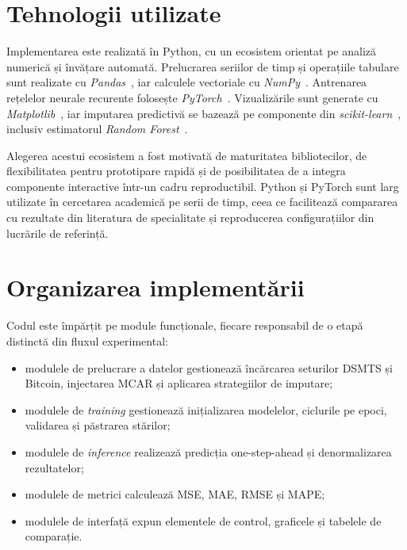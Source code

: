 \section{Tehnologii utilizate}

Implementarea este realizată în Python, cu un ecosistem orientat pe analiză numerică și învățare automată. Prelucrarea seriilor de timp și operațiile tabulare sunt realizate cu \textit{Pandas}~\cite{mckinney2010pandas}, iar calculele vectoriale cu \textit{NumPy}~\cite{harris2020numpy}. Antrenarea rețelelor neurale recurente folosește \textit{PyTorch}~\cite{paszke2019pytorch}. Vizualizările sunt generate cu \textit{Matplotlib}~\cite{hunter2007matplotlib}, iar imputarea predictivă se bazează pe componente din \textit{scikit-learn}~\cite{pedregosa2011sklearn}, inclusiv estimatorul \textit{Random Forest}~\cite{breiman2001rf}.

Alegerea acestui ecosistem a fost motivată de maturitatea bibliotecilor, de flexibilitatea pentru prototipare rapidă și de posibilitatea de a integra componente interactive într-un cadru reproductibil. Python și PyTorch sunt larg utilizate în cercetarea academică pe serii de timp, ceea ce facilitează compararea cu rezultate din literatura de specialitate și reproducerea configurațiilor din lucrările de referință.

\section{Organizarea implementării}

Codul este împărțit pe module funcționale, fiecare responsabil de o etapă distinctă din fluxul experimental:

\begin{itemize}
    \item modulele de prelucrare a datelor gestionează încărcarea seturilor DSMTS și Bitcoin, injectarea MCAR și aplicarea strategiilor de imputare;
    \item modulele de \textit{training} gestionează inițializarea modelelor, ciclurile pe epoci, validarea și păstrarea stărilor;
    \item modulele de \textit{inference} realizează predicția one-step-ahead și denormalizarea rezultatelor;
    \item modulele de metrici calculează MSE, MAE, RMSE și MAPE;
    \item modulele de interfață expun elementele de control, graficele și tabelele de comparație.
\end{itemize}


